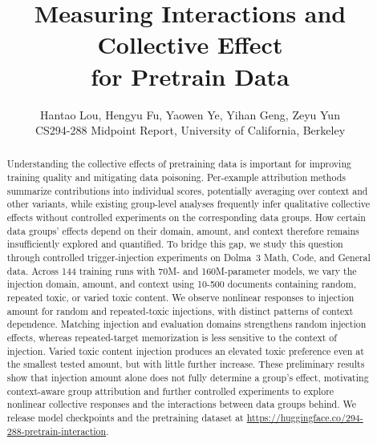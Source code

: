 \documentclass{article} %
\title{Measuring Interactions and Collective Effect\\ for Pretrain Data}
\author{Hantao Lou, Hengyu Fu, Yaowen Ye, Yihan Geng, Zeyu Yun \\
CS294-288 Midpoint Report, University of California, Berkeley}
\begin{document}
\ifcolmsubmission
\linenumbers
\fi

\maketitle

\begin{abstract}

Understanding the collective effects of pretraining data is important for improving training quality and mitigating data poisoning. Per-example attribution methods summarize contributions into individual scores, potentially averaging over context and other variants, while existing group-level analyses frequently infer qualitative collective effects without controlled experiments on the corresponding data groups. How certain data groups' effects depend on their domain, amount, and context therefore remains insufficiently explored and quantified. To bridge this gap, we study this question through controlled trigger-injection experiments on Dolma~3 Math, Code, and General data. Across 144 training runs with 70M- and 160M-parameter models, we vary the injection domain, amount, and context using 10-500 documents containing random, repeated toxic, or varied toxic content. We observe nonlinear responses to injection amount for random and repeated-toxic injections, with distinct patterns of context dependence. Matching injection and evaluation domains strengthens random injection effects, whereas repeated-target memorization is less sensitive to the context of injection. Varied toxic content injection produces an elevated toxic preference even at the smallest tested amount, but with little further increase. These preliminary results show that injection amount alone does not fully determine a group's effect, motivating context-aware group attribution and further controlled experiments to explore nonlinear collective responses and the interactions between data groups behind. We release model checkpoints and the pretraining dataset at \url{https://huggingface.co/294-288-pretrain-interaction}.




\end{abstract}
\end{document}

